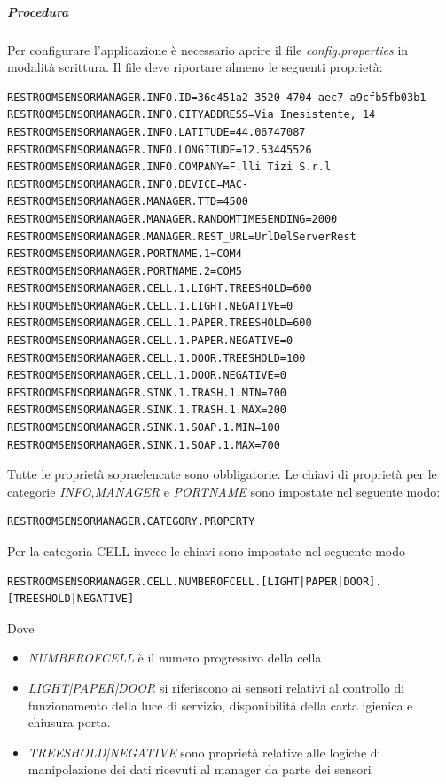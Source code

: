 \documentclass[12pt]{article}
\begin{document}
\subparagraph{Procedura}
Per configurare l'applicazione è necessario aprire il file \textit{config.properties} in modalità scrittura.
Il file deve riportare almeno le seguenti proprietà:
\begin{lstlisting}
RESTROOMSENSORMANAGER.INFO.ID=36e451a2-3520-4704-aec7-a9cfb5fb03b1
RESTROOMSENSORMANAGER.INFO.CITYADDRESS=Via Inesistente, 14
RESTROOMSENSORMANAGER.INFO.LATITUDE=44.06747087
RESTROOMSENSORMANAGER.INFO.LONGITUDE=12.53445526
RESTROOMSENSORMANAGER.INFO.COMPANY=F.lli Tizi S.r.l
RESTROOMSENSORMANAGER.INFO.DEVICE=MAC-
RESTROOMSENSORMANAGER.MANAGER.TTD=4500
RESTROOMSENSORMANAGER.MANAGER.RANDOMTIMESENDING=2000
RESTROOMSENSORMANAGER.MANAGER.REST_URL=UrlDelServerRest
RESTROOMSENSORMANAGER.PORTNAME.1=COM4
RESTROOMSENSORMANAGER.PORTNAME.2=COM5
RESTROOMSENSORMANAGER.CELL.1.LIGHT.TREESHOLD=600
RESTROOMSENSORMANAGER.CELL.1.LIGHT.NEGATIVE=0
RESTROOMSENSORMANAGER.CELL.1.PAPER.TREESHOLD=600
RESTROOMSENSORMANAGER.CELL.1.PAPER.NEGATIVE=0
RESTROOMSENSORMANAGER.CELL.1.DOOR.TREESHOLD=100
RESTROOMSENSORMANAGER.CELL.1.DOOR.NEGATIVE=0
RESTROOMSENSORMANAGER.SINK.1.TRASH.1.MIN=700
RESTROOMSENSORMANAGER.SINK.1.TRASH.1.MAX=200
RESTROOMSENSORMANAGER.SINK.1.SOAP.1.MIN=100
RESTROOMSENSORMANAGER.SINK.1.SOAP.1.MAX=700
\end{lstlisting}
Tutte le proprietà sopraelencate sono obbligatorie.
Le chiavi di proprietà per le categorie \textit{INFO},\textit{MANAGER} e \textit{PORTNAME} sono impostate nel seguente modo:
\begin{lstlisting}
RESTROOMSENSORMANAGER.CATEGORY.PROPERTY 
\end{lstlisting}

Per la categoria CELL invece le chiavi sono impostate nel seguente modo
\begin{lstlisting}
RESTROOMSENSORMANAGER.CELL.NUMBEROFCELL.[LIGHT|PAPER|DOOR].[TREESHOLD|NEGATIVE] 
\end{lstlisting}
Dove
\begin{itemize}
\item \textit{NUMBEROFCELL} è il numero progressivo della cella
\item \textit{LIGHT|PAPER|DOOR} si riferiscono ai sensori relativi al controllo di funzionamento della luce di servizio, disponibilità della carta igienica e chiusura porta.
\item \textit{TREESHOLD|NEGATIVE} sono proprietà relative alle logiche di manipolazione dei dati ricevuti al manager da parte dei sensori 
\end{itemize}
\end{document}
